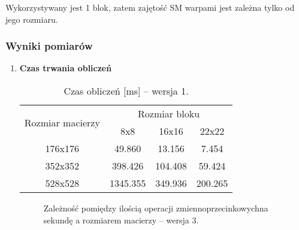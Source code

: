 Wykorzystywany jest 1 blok, zatem zajętość SM warpami jest zależna tylko od jego rozmiaru.

\subsubsection{Wyniki pomiarów}

\begin{enumerate}

\item \textbf{Czas trwania obliczeń} \newline

\begin{table}[H]
\centering
\begin{tabular}{|c|c|c|c|}
\hline
\multirow{2}{*}{Rozmiar macierzy} & \multicolumn{3}{c|}{Rozmiar bloku} \\ \cline{2-4}
& 8x8 & 16x16 & 22x22 \\ \hline
176x176 & 49.860 & 13.156 & 7.454 \\ \hline
352x352 & 398.426 & 104.408 & 59.424 \\ \hline
528x528 & 1345.355 & 349.936 & 200.265 \\ \hline
\end{tabular}
\caption{Czas obliczeń [ms] -- wersja 1.}
\end{table}

\begin{figure}[H]
\centering
\caption{Zależność pomiędzy ilością operacji zmiennoprzecinkowychna sekundę a rozmiarem macierzy -- wersja 3.}
\end{figure}



\end{enumerate}
